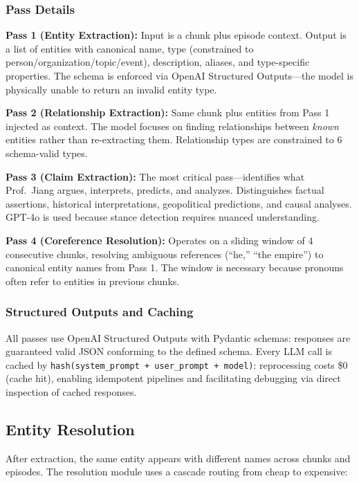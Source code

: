 \subsubsection{Pass Details}

\textbf{Pass 1 (Entity Extraction):} Input is a chunk plus episode context. Output is a list of entities with canonical name, type (constrained to person/organization/topic/event), description, aliases, and type-specific properties. The schema is enforced via OpenAI Structured Outputs---the model is physically unable to return an invalid entity type.

\textbf{Pass 2 (Relationship Extraction):} Same chunk plus entities from Pass 1 injected as context. The model focuses on finding relationships between \textit{known} entities rather than re-extracting them. Relationship types are constrained to 6 schema-valid types.

\textbf{Pass 3 (Claim Extraction):} The most critical pass---identifies what Prof.\ Jiang argues, interprets, predicts, and analyzes. Distinguishes factual assertions, historical interpretations, geopolitical predictions, and causal analyses. GPT-4o is used because stance detection requires nuanced understanding.

\textbf{Pass 4 (Coreference Resolution):} Operates on a sliding window of 4 consecutive chunks, resolving ambiguous references (``he,'' ``the empire'') to canonical entity names from Pass 1. The window is necessary because pronouns often refer to entities in previous chunks.

\subsubsection{Structured Outputs and Caching}

All passes use OpenAI Structured Outputs with Pydantic schemas: responses are guaranteed valid JSON conforming to the defined schema. Every LLM call is cached by \texttt{hash(system\_prompt + user\_prompt + model)}: reprocessing costs \$0 (cache hit), enabling idempotent pipelines and facilitating debugging via direct inspection of cached responses.

\subsection{Entity Resolution}

After extraction, the same entity appears with different names across chunks and episodes. The resolution module uses a cascade routing from cheap to expensive:

